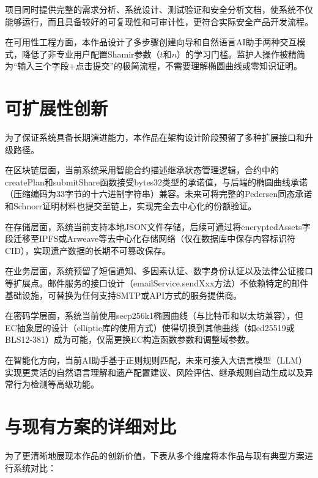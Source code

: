 \documentclass[UTF8,a4paper,zihao=-4,openany]{ctexrep}
\begin{document}
项目同时提供完整的需求分析、系统设计、测试验证和安全分析文档，使系统不仅能够运行，而且具备较好的可复现性和可审计性，更符合实际安全产品开发流程。

在可用性工程方面，本作品设计了多步骤创建向导和自然语言AI助手两种交互模式，降低了非专业用户配置Shamir参数（$t$和$n$）的学习门槛。监护人操作被精简为“输入三个字段+点击提交”的极简流程，不需要理解椭圆曲线或零知识证明。

\section{可扩展性创新}

为了保证系统具备长期演进能力，本作品在架构设计阶段预留了多种扩展接口和升级路径。

在区块链层面，当前系统采用智能合约描述继承状态管理逻辑，合约中的createPlan和submitShare函数接受bytes32类型的承诺值，与后端的椭圆曲线承诺（压缩编码为33字节的十六进制字符串）兼容。未来可将完整的Pedersen同态承诺和Schnorr证明材料也提交至链上，实现完全去中心化的份额验证。

在存储层面，系统当前支持本地JSON文件存储，后续可通过将encryptedAssets字段迁移至IPFS或Arweave等去中心化存储网络（仅在数据库中保存内容标识符CID），实现遗产数据的长期不可篡改保存。

在业务层面，系统预留了短信通知、多因素认证、数字身份认证以及法律公证接口等扩展点。邮件服务的接口设计（emailService.sendXxx方法）不依赖特定的邮件基础设施，可替换为任何支持SMTP或API方式的服务提供商。

在密码学层面，系统当前使用secp256k1椭圆曲线（与比特币和以太坊兼容），但EC抽象层的设计（elliptic库的使用方式）使得切换到其他曲线（如ed25519或BLS12-381）成为可能，仅需更换EC构造函数参数和调整域参数。

在智能化方向，当前AI助手基于正则规则匹配，未来可接入大语言模型（LLM）实现更灵活的自然语言理解和遗产配置建议、风险评估、继承规则自动生成以及异常行为检测等高级功能。

\section{与现有方案的详细对比}

为了更清晰地展现本作品的创新价值，下表从多个维度将本作品与现有典型方案进行系统对比：
\end{document}
